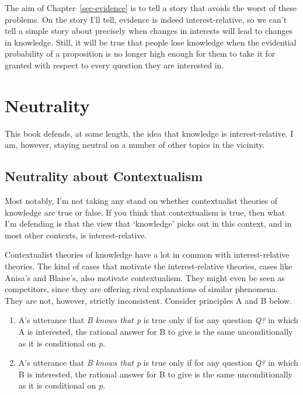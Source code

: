 \documentclass[
  10pt,
  letterpaper,
  twoside]{scrbook}
\providecommand{\tightlist}{%
  \setlength{\itemsep}{0pt}\setlength{\parskip}{0pt}}\usepackage{longtable,booktabs,array}
\begin{document}
The aim of Chapter~\ref{sec-evidence} is to tell a story that avoids the
worst of these problems. On the story I'll tell, evidence is indeed
interest-relative, so we can't tell a simple story about precisely when
changes in interests will lead to changes in knowledge. Still, it will
be true that people lose knowledge when the evidential probability of a
proposition is no longer high enough for them to take it for granted
with respect to every question they are interested in.

\section{Neutrality}\label{sec-neutrality}

This book defends, at some length, the idea that knowledge is
interest-relative. I am, however, staying neutral on a number of other
topics in the vicinity.

\subsection{Neutrality about
Contextualism}\label{sec-neutrality-contextualism}

Most notably, I'm not taking any stand on whether contextualist theories
of knowledge are true or false. If you think that contextualism is true,
then what I'm defending is that the view that `knowledge' picks out in
this context, and in most other contexts, is interest-relative.

Contextualist theories of knowledge have a lot in common with
interest-relative theories. The kind of cases that motivate the
interest-relative theories, cases like Anisa's and Blaise's, also
motivate contextualism. They might even be seen as competitors, since
they are offering rival explanations of similar phenomena. They are not,
however, strictly inconsistent. Consider principles A and B below.

\begin{enumerate}
\def\labelenumi{\Alph{enumi}.}
\tightlist
\item
  A's utterance that \emph{B knows that p} is true only if for any
  question \emph{Q?} in which A is interested, the rational answer for B
  to give is the same unconditionally as it is conditional on \emph{p}.
\item
  A's utterance that \emph{B knows that p} is true only if for any
  question \emph{Q?} in which B is interested, the rational answer for B
  to give is the same unconditionally as it is conditional on \emph{p}.
\end{enumerate}
\end{document}
